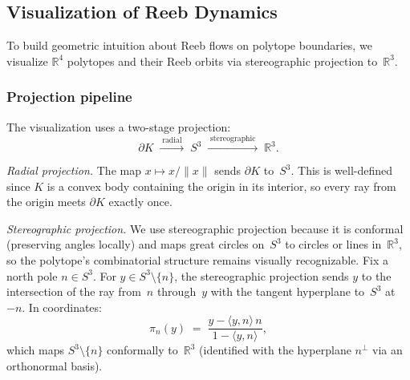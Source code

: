 %
%

\subsection{Visualization of Reeb Dynamics}
\label{sec:visualization}

To build geometric intuition about Reeb flows on polytope boundaries,
we visualize $\mathbb{R}^4$ polytopes and their Reeb orbits via
stereographic projection to~$\mathbb{R}^3$.

\subsubsection*{Projection pipeline}

The visualization uses a two-stage projection:
\[
  \partial K \;\xrightarrow{\;\text{radial}\;}\; S^3
  \;\xrightarrow{\;\text{stereographic}\;}\; \mathbb{R}^3.
\]

\emph{Radial projection.}
The map $x \mapsto x / \lVert x \rVert$ sends $\partial K$ to~$S^3$.
This is well-defined since $K$ is a convex body containing the origin
in its interior, so every ray from the origin meets $\partial K$
exactly once.

\emph{Stereographic projection.}
We use stereographic projection because it is conformal
(preserving angles locally) and maps great circles on~$S^3$
to circles or lines in~$\mathbb{R}^3$, so the polytope's
combinatorial structure remains visually recognizable.
Fix a north pole $n \in S^3$. For $y \in S^3 \setminus \{n\}$,
the stereographic projection sends $y$ to the intersection of the ray
from~$n$ through~$y$ with the tangent hyperplane to~$S^3$ at~$-n$.
In coordinates:
\begin{equation}
  \label{eq:stereo-proj}
  \pi_n(y) \;=\; \frac{y - \langle y, n \rangle \, n}{1 - \langle y, n \rangle},
\end{equation}
which maps $S^3 \setminus \{n\}$ conformally to~$\mathbb{R}^3$
(identified with the hyperplane $n^\perp$ via an orthonormal basis).

